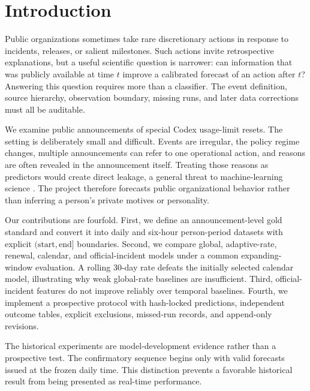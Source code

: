 \section{Introduction}

Public organizations sometimes take rare discretionary actions in response to incidents, releases,
or salient milestones. Such actions invite retrospective explanations, but a useful scientific
question is narrower: can information that was publicly available at time $t$ improve a calibrated
forecast of an action after $t$? Answering this question requires more than a classifier. The event
definition, source hierarchy, observation boundary, missing runs, and later data corrections must
all be auditable.

We examine public announcements of special Codex usage-limit resets. The setting is deliberately
small and difficult. Events are irregular, the policy regime changes, multiple announcements can
refer to one operational action, and reasons are often revealed in the announcement itself. Treating
those reasons as predictors would create direct leakage, a general threat to machine-learning
science \citep{kapoor2023leakage}. The project therefore forecasts public organizational behavior
rather than inferring a person's private motives or personality.

Our contributions are fourfold. First, we define an announcement-level gold standard and convert it
into daily and six-hour person-period datasets with explicit $(\text{start},\text{end}]$ boundaries.
Second, we compare global, adaptive-rate, renewal, calendar, and official-incident models under a
common expanding-window evaluation. A rolling 30-day rate defeats the initially selected calendar
model, illustrating why weak global-rate baselines are insufficient. Third, official-incident
features do not improve reliably over temporal baselines. Fourth, we implement a prospective protocol
with hash-locked predictions, independent outcome tables, explicit exclusions, missed-run records,
and append-only revisions.

The historical experiments are model-development evidence rather than a prospective test. The
confirmatory sequence begins only with valid forecasts issued at the frozen daily time. This
distinction prevents a favorable historical result from being presented as real-time performance.
